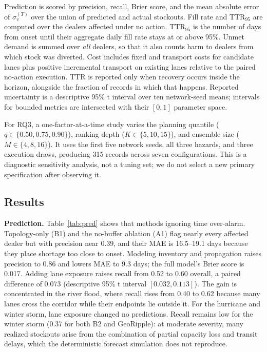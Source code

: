 \documentclass[conference]{IEEEtran}
\begin{document}
Prediction is scored by precision, recall, Brier score, and the mean absolute error of
$\sigma_v^{(T)}$ over the union of predicted and actual stockouts. Fill rate and TTR$_{95}$ are computed over the
dealers affected under no action. TTR$_{95}$ is the number of days from
onset until their aggregate daily fill rate stays at or above 95\%.
Unmet demand is summed over \emph{all} dealers, so that it also counts
harm to dealers from which stock was diverted. Cost includes fixed and
transport costs for candidate lanes plus positive incremental transport
on existing lanes relative to the paired no-action execution. TTR is
reported only when recovery occurs inside the horizon, alongside the
fraction of records in which that happens. Reported uncertainty is a
descriptive 95\% t interval over ten network-seed means; intervals for
bounded metrics are intersected with their $[0,1]$ parameter space.

For RQ3, a one-factor-at-a-time study varies the planning quantile
($q\in\{0.50,0.75,0.90\}$), ranking depth ($K\in\{5,10,15\}$), and ensemble
size ($M\in\{4,8,16\}$). It uses the first five network seeds, all three
hazards, and three execution draws, producing 315 records across seven
configurations. This is a diagnostic sensitivity analysis, not a tuning set;
we do not select a new primary specification after observing it.

\subsection{Results}


\textbf{Prediction.} Table~\ref{tab:pred} shows that methods ignoring time
over-alarm. Topology-only (B1) and the no-buffer ablation (A1) flag
nearly every affected dealer but with precision near 0.39, and their MAE is
16.5--19.1 days because they place shortage too close to onset. Modeling
inventory and propagation raises precision to 0.86 and lowers MAE to 9.3
days; the full model's Brier score is 0.017. Adding lane exposure raises
recall from 0.52 to 0.60 overall, a paired difference of 0.073 (descriptive
95\% t interval $[0.032,0.113]$). The gain is concentrated in the river
flood, where recall rises from 0.40 to 0.62
because many lanes cross the corridor while their endpoints lie outside
it. For the hurricane and winter storm, lane exposure changed no
predictions. Recall remains low for the winter storm (0.37 for both B2
and GeoRipple): at moderate severity, many realized stockouts arise from
the combination of partial capacity loss and transit delays, which the
deterministic forecast simulation does not reproduce.
\end{document}
